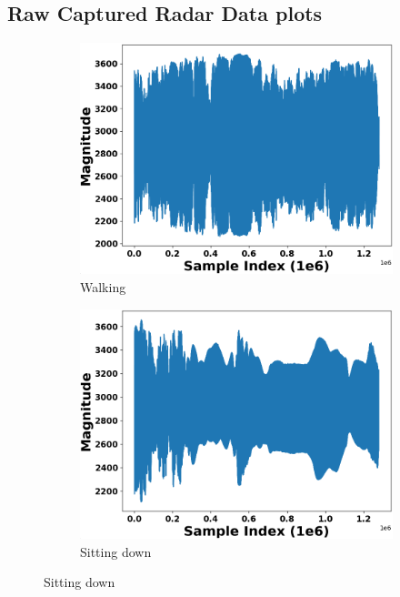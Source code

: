 \documentclass{l4proj}
\begin{document}
\begin{appendices}
\section{Raw Captured Radar Data plots}
\begin{figure}[h]
   \centering
   \begin{subfigure}[b]{0.32\textwidth}
        \includegraphics[width=\textwidth]{images/raw_data1.png}
        \caption{Walking}
        \label{fig:raw_data1}
    \end{subfigure}
    \hfill
    \begin{subfigure}[b]{0.32\textwidth}
        \includegraphics[width=\textwidth]{images/raw_data2.png}
        \caption{Sitting down}
        \label{fig:raw_data2}
    \end{subfigure}

\end{figure}
\end{appendices}
\end{document}
